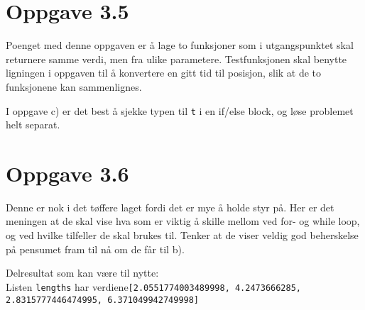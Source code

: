 \documentclass[10pt,a4paper]{article}
\begin{document}
\newpage
\section*{Oppgave 3.5}
Poenget med denne oppgaven er å lage to funksjoner som i utgangspunktet skal returnere samme verdi, men fra ulike parametere. Testfunksjonen skal benytte ligningen i oppgaven til å konvertere en gitt tid til posisjon, slik at de to funksjonene kan sammenlignes.

I oppgave c) er det best å sjekke typen til \texttt{t} i en if/else block, og løse problemet helt separat.



\newpage
\section*{Oppgave 3.6}
Denne er nok i det tøffere laget fordi det er mye å holde styr på. Her er det meningen at de skal vise hva som er viktig å skille mellom ved for- og while loop, og ved hvilke tilfeller de skal brukes til. Tenker at de viser veldig god beherskelse på pensumet fram til nå om de får til b). 

Delresultat som kan være til nytte:\\
Listen \texttt{lengths} har verdiene\texttt{[2.0551774003489998, 4.2473666285, 2.8315777446474995, 6.371049942749998]}
\end{document}
